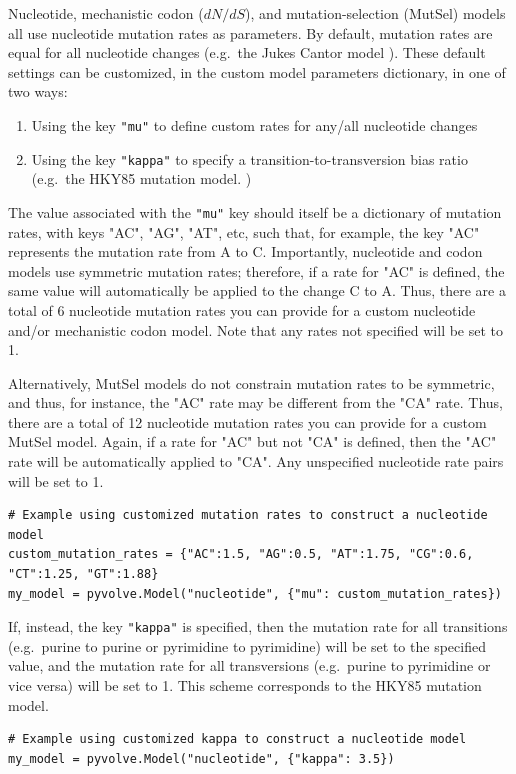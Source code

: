 \documentclass{article}
\newcommand{\code}[1]{\texttt{\small{#1}}}
\begin{document}
Nucleotide, mechanistic codon ($dN/dS$), and mutation-selection (MutSel) models all use nucleotide mutation rates as parameters. By default, mutation rates are equal for all nucleotide changes (e.g.\ the Jukes Cantor model \citep{JC69}). These default settings can be customized, in the custom model parameters dictionary, in one of two ways:
\begin{enumerate}
	\item Using the key \code{"mu"} to define custom rates for any/all nucleotide changes
	\item Using the key \code{"kappa"} to specify a transition-to-transversion bias ratio (e.g.\ the HKY85 mutation model. \citep{HKY85})
\end{enumerate}
The value associated with the \code{"mu"} key should itself be a dictionary of mutation rates, with keys "AC", "AG", "AT", etc, such that, for example, the key "AC" represents the mutation rate from A to C. Importantly, nucleotide and codon models use symmetric mutation rates; therefore, if a rate for "AC" is defined, the same value will automatically be applied to the change C to A. Thus, there are a total of 6 nucleotide mutation rates you can provide for a custom nucleotide and/or mechanistic codon model. Note that any rates not specified will be set to 1.

Alternatively, MutSel models do not constrain mutation rates to be symmetric, and thus, for instance, the "AC" rate may be different from the "CA" rate. Thus, there are a total of 12 nucleotide mutation rates you can provide for a custom MutSel model. Again, if a rate for "AC" but not "CA" is defined, then the "AC" rate will be automatically applied to "CA". Any unspecified nucleotide rate pairs will be set to 1.
\begin{lstlisting}
# Example using customized mutation rates to construct a nucleotide model
custom_mutation_rates = {"AC":1.5, "AG":0.5, "AT":1.75, "CG":0.6, "CT":1.25, "GT":1.88}
my_model = pyvolve.Model("nucleotide", {"mu": custom_mutation_rates})
\end{lstlisting}

If, instead, the key \code{"kappa"} is specified, then the mutation rate for all transitions (e.g.\ purine to purine or pyrimidine to pyrimidine) will be set to the specified value, and the mutation rate for all transversions (e.g.\ purine to pyrimidine or vice versa) will be set to 1. This scheme corresponds to the HKY85 \citep{HKY85} mutation model.
\begin{lstlisting}
# Example using customized kappa to construct a nucleotide model
my_model = pyvolve.Model("nucleotide", {"kappa": 3.5})
\end{lstlisting}
\end{document}
